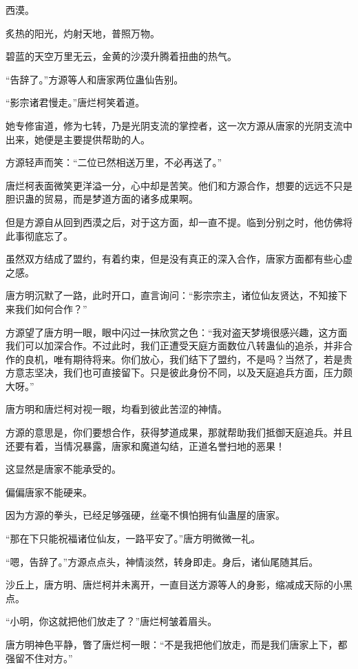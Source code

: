 
\begin{this_body}

西漠。

炙热的阳光，灼射天地，普照万物。

碧蓝的天空万里无云，金黄的沙漠升腾着扭曲的热气。

“告辞了。”方源等人和唐家两位蛊仙告别。

“影宗诸君慢走。”唐烂柯笑着道。

她专修宙道，修为七转，乃是光阴支流的掌控者，这一次方源从唐家的光阴支流中出来，她便是主要提供帮助的人。

方源轻声而笑：“二位已然相送万里，不必再送了。”

唐烂柯表面微笑更洋溢一分，心中却是苦笑。他们和方源合作，想要的远远不只是胆识蛊的贸易，而是梦道方面的诸多成果啊。

但是方源自从回到西漠之后，对于这方面，却一直不提。临到分别之时，他仿佛将此事彻底忘了。

虽然双方结成了盟约，有着约束，但是没有真正的深入合作，唐家方面都有些心虚之感。

唐方明沉默了一路，此时开口，直言询问：“影宗宗主，诸位仙友贤达，不知接下来我们如何合作？”

方源望了唐方明一眼，眼中闪过一抹欣赏之色：“我对盗天梦境很感兴趣，这方面我们可以加深合作。不过此时，我们正遭受天庭方面数位八转蛊仙的追杀，并非合作的良机，唯有期待将来。你们放心，我们结下了盟约，不是吗？当然了，若是贵方意志坚决，我们也可直接留下。只是彼此身份不同，以及天庭追兵方面，压力颇大呀。”

唐方明和唐烂柯对视一眼，均看到彼此苦涩的神情。

方源的意思是，你们要想合作，获得梦道成果，那就帮助我们抵御天庭追兵。并且还要有着，当情况暴露，唐家和魔道勾结，正道名誉扫地的恶果！

这显然是唐家不能承受的。

偏偏唐家不能硬来。

因为方源的拳头，已经足够强硬，丝毫不惧怕拥有仙蛊屋的唐家。

“那在下只能祝福诸位仙友，一路平安了。”唐方明微微一礼。

“嗯，告辞了。”方源点点头，神情淡然，转身即走。身后，诸仙尾随其后。

沙丘上，唐方明、唐烂柯并未离开，一直目送方源等人的身影，缩减成天际的小黑点。

“小明，你这就把他们放走了？”唐烂柯皱着眉头。

唐方明神色平静，瞥了唐烂柯一眼：“不是我把他们放走，而是我们唐家上下，都强留不住对方。”


\end{this_body}
